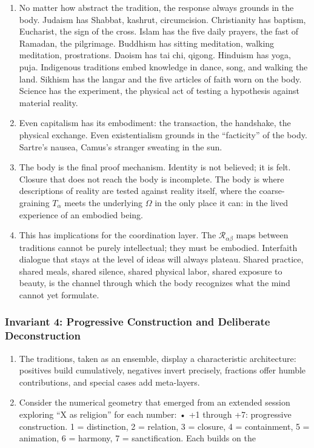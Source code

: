 \documentclass[
]{article}
\providecommand{\tightlist}{%
  \setlength{\itemsep}{0pt}\setlength{\parskip}{0pt}}
\begin{document}
\begin{enumerate}
\def\labelenumi{\arabic{enumi}.}
\setcounter{enumi}{169}
\item
  No matter how abstract the tradition, the response always grounds in
  the body. Judaism has Shabbat, kashrut, circumcision. Christianity has
  baptism, Eucharist, the sign of the cross. Islam has the five daily
  prayers, the fast of Ramadan, the pilgrimage. Buddhism has sitting
  meditation, walking meditation, prostrations. Daoism has tai chi,
  qigong. Hinduism has yoga, puja. Indigenous traditions embed knowledge
  in dance, song, and walking the land. Sikhism has the langar and the
  five articles of faith worn on the body. Science has the experiment,
  the physical act of testing a hypothesis against material reality.
\item
  Even capitalism has its embodiment: the transaction, the handshake,
  the physical exchange. Even existentialism grounds in the
  ``facticity'' of the body. Sartre's nausea, Camus's stranger sweating
  in the sun.
\item
  The body is the final proof mechanism. Identity is not believed; it is
  felt. Closure that does not reach the body is incomplete. The body is
  where descriptions of reality are tested against reality itself, where
  the coarse-graining \(T_\alpha\) meets the underlying \(\Omega\) in
  the only place it can: in the lived experience of an embodied being.
\item
  This has implications for the coordination layer. The
  \(\mathcal{R}_{\alpha\beta}\) maps between traditions cannot be purely
  intellectual; they must be embodied. Interfaith dialogue that stays at
  the level of ideas will always plateau. Shared practice, shared meals,
  shared silence, shared physical labor, shared exposure to beauty, is
  the channel through which the body recognizes what the mind cannot yet
  formulate.
\end{enumerate}

\subsubsection{Invariant 4: Progressive Construction and Deliberate
Deconstruction}\label{invariant-4-progressive-construction-and-deliberate-deconstruction}

\begin{enumerate}
\def\labelenumi{\arabic{enumi}.}
\setcounter{enumi}{173}
\tightlist
\item
  The traditions, taken as an ensemble, display a characteristic
  architecture: positives build cumulatively, negatives invert
  precisely, fractions offer humble contributions, and special cases add
  meta-layers.
\item
  Consider the numerical geometry that emerged from an extended session
  exploring ``X as religion'' for each number: • +1 through +7:
  progressive construction. 1 = distinction, 2 = relation, 3 = closure,
  4 = containment, 5 = animation, 6 = harmony, 7 = sanctification. Each
  builds on the
\end{enumerate}
\end{document}
